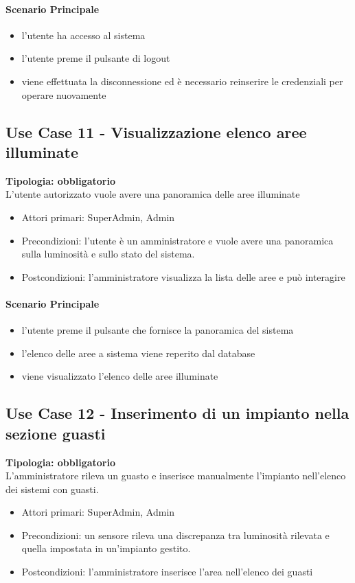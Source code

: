 \documentclass[12pt]{article}
\begin{document}
\paragraph{Scenario Principale}
\begin{itemize}
	\item l'utente ha accesso al sistema
	\item l'utente preme il pulsante di logout
	\item viene effettuata la disconnessione ed è necessario reinserire le credenziali per operare nuovamente
\end{itemize}


\subsection{Use Case 11 - Visualizzazione elenco aree illuminate}
\textbf{Tipologia: obbligatorio} \\
L'utente autorizzato vuole avere una panoramica delle aree illuminate
\begin{itemize}
	\item Attori primari: SuperAdmin, Admin
	\item Precondizioni: l'utente è un amministratore e vuole avere una panoramica sulla luminosità e sullo stato del sistema.
	\item Postcondizioni: l'amministratore visualizza la lista delle aree e può interagire
\end{itemize}
\paragraph{Scenario Principale}
\begin{itemize}
	\item l'utente preme il pulsante che fornisce la panoramica del sistema
	\item l'elenco delle aree a sistema viene reperito dal database
	\item viene visualizzato l'elenco delle aree illuminate
\end{itemize}


\subsection{Use Case 12 - Inserimento di un impianto nella sezione guasti}
\textbf{Tipologia: obbligatorio} \\
L'amministratore rileva un guasto e inserisce manualmente l'impianto nell'elenco dei sistemi con guasti.
\begin{itemize}
	\item Attori primari: SuperAdmin, Admin
	\item Precondizioni: un sensore rileva una discrepanza tra luminosità rilevata e quella impostata in un'impianto gestito.
	\item Postcondizioni: l'amministratore inserisce l'area nell'elenco dei guasti
\end{itemize}
\end{document}

